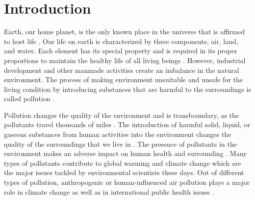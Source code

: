 \chapter{Introduction}
\setcounter{page}{1}




Earth, our home planet, is the only known place in the universe that is affirmed to host life  \cite{daly2007introduction}. Our life on earth is characterized by three components, air, land, and water. Each element has its special property and is required in its proper proportions to maintain the healthy life of all living beings \cite{daly2007introduction}. %
However, industrial development and other manmade activities create an imbalance in the natural environment. The process of making environment unsuitable and unsafe for the living condition by introducing substances that are harmful to the surroundings is called pollution \cite{manisalidis2020environmental}. 
\par
 Pollution changes the quality of the environment and is transboundary, as the pollutants travel thousands of miles \cite{daly2007introduction}. The introduction of harmful solid, liquid, or gaseous substances from human activities into the environment changes the quality of the surroundings that we live in \cite{manisalidis2020environmental}. The presence of pollutants in the environment makes an adverse impact on human health and surrounding \cite{bernes1998persistent}  \cite{ritter1995persistent}. Many types of pollutants contribute to global warming and climate change which are the major issues tackled by environmental scientists these days. Out of different types of pollution, anthropogenic or human-influenced air pollution plays a major role in climate change as well as in international public health issues \cite{manisalidis2020environmental}.
 

  

